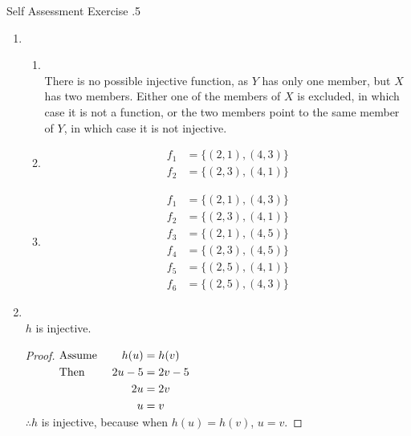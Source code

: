 \documentclass[\main/notes.tex]{subfiles}
\begin{document}
				\begin{exercise}{Self Assessment Exercise \thechapter.5}
					\begin{enumerate}
						\item {}
							\begin{enumerate}
								\item {}\\
									There is no possible injective function, as $Y$ has only one member, but $X$ has two members. Either one of the members of $X$ is excluded, in which case it is not a function, or the two members point to the same member of $Y$, in which case it is not injective.
								\item {}
									\begin{align*}
										f_{1} &= \bigl\{(2, 1), (4, 3)\bigr\}\\
										f_{2} &= \bigl\{(2, 3), (4, 1)\bigr\}
									\end{align*}
								\item {}
									\begin{align*}
										f_{1} &= \bigl\{(2, 1), (4, 3)\bigr\}\\
										f_{2} &= \bigl\{(2, 3), (4, 1)\bigr\}\\
										f_{3} &= \bigl\{(2, 1), (4, 5)\bigr\}\\
										f_{4} &= \bigl\{(2, 3), (4, 5)\bigr\}\\
										f_{5} &= \bigl\{(2, 5), (4, 1)\bigr\}\\
										f_{6} &= \bigl\{(2, 5), (4, 3)\bigr\}
									\end{align*}
							\end{enumerate}
						\item {}\\
							$h$ is injective.
							\begin{proof} $
								\begin{alignedat}[t]{2}
									& \text{Assume } \quad &h(u) &= h(v)\\
									& \text{Then } &2u - 5 &= 2v - 5\\
									& & 2u &= 2v\\
									& & u &= v
								\end{alignedat} $\\
								$\therefore h$ is injective, because when $h(u) = h(v)$, $u = v$.
							\end{proof}
					\end{enumerate}
				\end{exercise}
			\pagebreak
\end{document}
